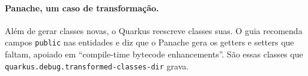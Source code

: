 \paragraph{Panache, um caso de transformação.}
Além de gerar classes novas, o Quarkus reescreve classes suas. O guia
 recomenda campos \texttt{public} nas
entidades e diz que o Panache gera os getters e setters que faltam,
apoiado em \enquote{compile-time bytecode enhancements}. São essas
classes que \texttt{quarkus.debug.transformed-classes-dir} grava.
